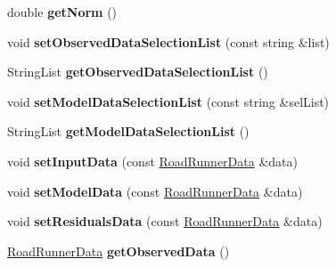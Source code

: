 \begin{DoxyCompactItemize}
\item 
\hypertarget{classrr_1_1_minimization_data_a109bc69de9c7c86f51e65992d34fe291}{double {\bfseries get\-Norm} ()}\label{classrr_1_1_minimization_data_a109bc69de9c7c86f51e65992d34fe291}

\item 
\hypertarget{classrr_1_1_minimization_data_a2d22c7129b2253de26a7e92bc49002a4}{void {\bfseries set\-Observed\-Data\-Selection\-List} (const string \&list)}\label{classrr_1_1_minimization_data_a2d22c7129b2253de26a7e92bc49002a4}

\item 
\hypertarget{classrr_1_1_minimization_data_a7124bd175381447050d5aea4dbf1dab1}{String\-List {\bfseries get\-Observed\-Data\-Selection\-List} ()}\label{classrr_1_1_minimization_data_a7124bd175381447050d5aea4dbf1dab1}

\item 
\hypertarget{classrr_1_1_minimization_data_a9c89481fbb732d0015b682bf1480be03}{void {\bfseries set\-Model\-Data\-Selection\-List} (const string \&sel\-List)}\label{classrr_1_1_minimization_data_a9c89481fbb732d0015b682bf1480be03}

\item 
\hypertarget{classrr_1_1_minimization_data_a85f626e30ad5e54e6d875514c7518124}{String\-List {\bfseries get\-Model\-Data\-Selection\-List} ()}\label{classrr_1_1_minimization_data_a85f626e30ad5e54e6d875514c7518124}

\item 
\hypertarget{classrr_1_1_minimization_data_a68a45d7bfeb9c2ec161119e5e16140ea}{void {\bfseries set\-Input\-Data} (const \hyperlink{classrr_1_1_road_runner_data}{Road\-Runner\-Data} \&data)}\label{classrr_1_1_minimization_data_a68a45d7bfeb9c2ec161119e5e16140ea}

\item 
\hypertarget{classrr_1_1_minimization_data_a52436970ca797f92ee2dd17052b32c0e}{void {\bfseries set\-Model\-Data} (const \hyperlink{classrr_1_1_road_runner_data}{Road\-Runner\-Data} \&data)}\label{classrr_1_1_minimization_data_a52436970ca797f92ee2dd17052b32c0e}

\item 
\hypertarget{classrr_1_1_minimization_data_a7165dc79a35e22da3c17a71140a1aade}{void {\bfseries set\-Residuals\-Data} (const \hyperlink{classrr_1_1_road_runner_data}{Road\-Runner\-Data} \&data)}\label{classrr_1_1_minimization_data_a7165dc79a35e22da3c17a71140a1aade}

\item 
\hypertarget{classrr_1_1_minimization_data_a1e9db817a96e70a80a86b90d2c984fa2}{\hyperlink{classrr_1_1_road_runner_data}{Road\-Runner\-Data} {\bfseries get\-Observed\-Data} ()}\label{classrr_1_1_minimization_data_a1e9db817a96e70a80a86b90d2c984fa2}


\end{DoxyCompactItemize}
